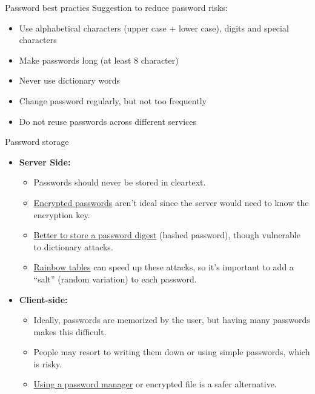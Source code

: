 \begin{quotebox-grey}{Password best practies}
    Suggestion to reduce password risks:
    \begin{itemize}
        \item Use alphabetical characters (upper case + lower case), digits and special characters
        \item Make passwords long (at least 8 character)
        \item Never use dictionary words
        \item Change password regularly, but not too frequently
        \item Do not reuse passwords across different services
    \end{itemize}
\end{quotebox-grey}


\begin{quotebox-yellow}{Password storage}
    \begin{itemize}
        \item \textbf{Server Side:}
        \begin{itemize}
            \item Passwords should never be stored in cleartext.
            \item \underline{Encrypted passwords} aren't ideal since the server would need to know the encryption key.
            \item \underline{Better to store a password digest} (hashed password), though vulnerable to dictionary attacks.
            \item \underline{Rainbow tables} can speed up these attacks, so it’s important to add a “salt” (random variation) to each password.
        \end{itemize}
        \item \textbf{Client-side:}
        \begin{itemize}
            \item Ideally, passwords are memorized by the user, but having many passwords makes this difficult.
            \item People may resort to writing them down or using simple passwords, which is risky.
            \item \underline{Using a password manager} or encrypted file is a safer alternative.
        \end{itemize}
    \end{itemize}
\end{quotebox-yellow}



